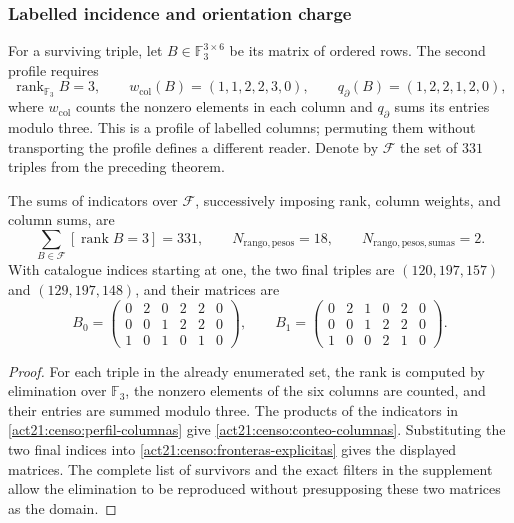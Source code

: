 \subsubsection{Labelled incidence and orientation charge}

For a surviving triple, let \(B\in\mathbb F_3^{3\times6}\) be its
matrix of ordered rows. The second profile requires
\begin{equation}
 \operatorname{rank}_{\mathbb F_3}B=3,\qquad
 w_{\mathrm{col}}(B)=(1,1,2,2,3,0),\qquad
 q_{\partial}(B)=(1,2,2,1,2,0),
 \label{act21:censo:perfil-columnas}
\end{equation}
where \(w_{\mathrm{col}}\) counts the nonzero elements in each
column and \(q_{\partial}\) sums its entries modulo three. This is a profile
of labelled columns; permuting them without transporting the profile defines a different
reader. Denote by \(\mathcal F\) the set of \(331\) triples
from the preceding theorem.

\begin{proposition}
\label{act21:censo:dos-matrices}
The sums of indicators over \(\mathcal F\), successively imposing
rank, column weights, and column sums, are
\begin{equation}
 \sum_{B\in\mathcal F}[\operatorname{rank}B=3]=331,
 \qquad N_{\mathrm{rango,pesos}}=18,
 \qquad N_{\mathrm{rango,pesos,sumas}}=2.
 \label{act21:censo:conteo-columnas}
\end{equation}
With catalogue indices starting at one, the two final triples are
\((120,197,157)\) and \((129,197,148)\), and their matrices are
\[
 B_0=\begin{pmatrix}0&2&0&2&2&0\\0&0&1&2&2&0\\1&0&1&0&1&0\end{pmatrix},
 \qquad
 B_1=\begin{pmatrix}0&2&1&0&2&0\\0&0&1&2&2&0\\1&0&0&2&1&0\end{pmatrix}.
\]
\end{proposition}
\begin{proof}
For each triple in the already enumerated set, the rank is computed by elimination
over \(\mathbb F_3\), the nonzero elements of the six
columns are counted, and their entries are summed modulo three. The products of the indicators
in \eqref{act21:censo:perfil-columnas} give \eqref{act21:censo:conteo-columnas}.
Substituting the two final indices into
\eqref{act21:censo:fronteras-explicitas} gives the displayed matrices. The complete
list of survivors and the exact filters in the supplement allow
the elimination to be reproduced without presupposing these two matrices as the domain.
\end{proof}

